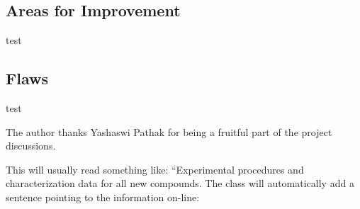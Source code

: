 \documentclass[journal=jacsat,manuscript=article]{achemso}
\begin{document}
\subsection{Areas for Improvement}
\quad test

\subsection{Flaws}
\quad test

\begin{acknowledgement}
    The author thanks Yashaswi Pathak for being a fruitful part of the project discussions.

\end{acknowledgement}

\begin{suppinfo}

    This will usually read something like: ``Experimental procedures and
    characterization data for all new compounds. The class will
    automatically add a sentence pointing to the information on-line:

\end{suppinfo}


\end{document}
